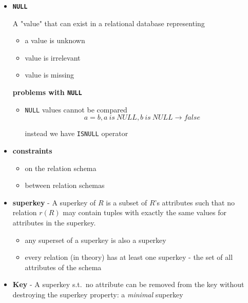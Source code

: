 \documentclass{../cheatsheet}
\begin{document}
\begin{multicols*}{2}
\begin{itemize}
\begin{itemize}
            \end{itemize}

        \item \textbf{\texttt{NULL}}

            A "value" that can exist in a relational database representing
            \begin{itemize}
                \item a value is unknown
                \item value is irrelevant
                \item value is missing
            \end{itemize}

            \textbf{problems with \texttt{NULL}}
            \begin{itemize}
                \item \texttt{NULL} values cannot be compared
                    $$a = b, a\ is\ NULL, b\ is\ NULL \rightarrow false$$

                    instead we have \texttt{ISNULL} operator
            \end{itemize}

        \item \textbf{constraints}
            \begin{itemize}
                \item on the relation schema
                \item between relation schemas
            \end{itemize}

        \item \textbf{superkey} - A superkey of $R$ is a subset of $R$'s
            attributes such that no relation $r(R)$ may contain tuples with
            exactly the same values for attributes in the superkey.
            \begin{itemize}
                \item any superset of a superkey is also a superkey
                \item every relation (in theory) has at least one superkey - the
                    set of all attributes of the schema
            \end{itemize}

        \item \textbf{Key} - A superkey s.t.\ no attribute can be removed from
            the key without destroying the superkey property: a \textit{minimal}
            superkey


\end{itemize}
\end{multicols*}
\end{document}
